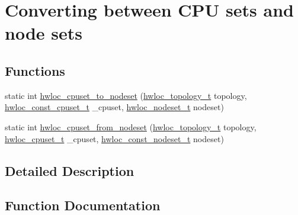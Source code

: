 \hypertarget{a00203}{}\section{Converting between C\+PU sets and node sets}
\label{a00203}
\subsection*{Functions}
\begin{DoxyCompactItemize}
\item 
static int \hyperlink{a00203_ga185751c1653fedbeb7cc480840f38cde}{hwloc\+\_\+cpuset\+\_\+to\+\_\+nodeset} (\hyperlink{a00186_ga9d1e76ee15a7dee158b786c30b6a6e38}{hwloc\+\_\+topology\+\_\+t} topology, \hyperlink{a00183_ga1f784433e9b606261f62d1134f6a3b25}{hwloc\+\_\+const\+\_\+cpuset\+\_\+t} \+\_\+cpuset, \hyperlink{a00183_ga37e35730fa7e775b5bb0afe893d6d508}{hwloc\+\_\+nodeset\+\_\+t} nodeset)
\item 
static int \hyperlink{a00203_gad5ee8691e08a3538ea7633344c00456d}{hwloc\+\_\+cpuset\+\_\+from\+\_\+nodeset} (\hyperlink{a00186_ga9d1e76ee15a7dee158b786c30b6a6e38}{hwloc\+\_\+topology\+\_\+t} topology, \hyperlink{a00183_ga4bbf39b68b6f568fb92739e7c0ea7801}{hwloc\+\_\+cpuset\+\_\+t} \+\_\+cpuset, \hyperlink{a00183_ga2f5276235841ad66a79bedad16a5a10c}{hwloc\+\_\+const\+\_\+nodeset\+\_\+t} nodeset)
\end{DoxyCompactItemize}


\subsection{Detailed Description}


\subsection{Function Documentation}
\mbox{\label{a00203_gad5ee8691e08a3538ea7633344c00456d}} 
